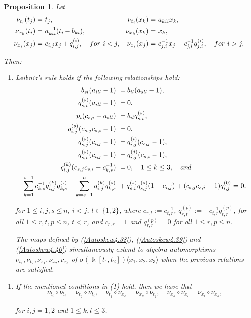 \documentclass{amsart}
\newtheorem{proposition}[theorem]{Proposition}
\theoremstyle{definition}
\theoremstyle{remark}
\numberwithin{equation}{section}
\begin{document}
\begin{proposition}\label{autoSkewPBW23}
Let
\begin{align}
   \nu_{t_i}(t_j) = &\ t_j, & \nu_{t_i}(x_k) = &\ a_{kii}x_k, \label{Autoskew4.38} \\
   \nu_{x_k}(t_i) = &\ a_{kii}^{-1}(t_i-b_{ki}),   &  \nu_{x_k}(x_k) = &\ x_k, \label{Autoskew4.39} \\
   \nu_{x_i}(x_j) = &\ c_{i,j}x_j+q_{i,j}^{(i)}, \quad {\rm for}\ i < j, & \nu_{x_i}(x_j) = &\ c_{j,i}^{-1}x_j-c_{j,i}^{-1}q_{j,i}^{(i)},  \quad {\rm for}\ i > j,  \label{Autoskew4.40}   
\end{align}

Then:
\begin{enumerate}
\item [\rm (1)] Leibniz's rule holds if the following relationships hold:
\begin{align}
    b_{sl}(a_{ill}-1) &\ =b_{il}(a_{sll}-1), \label{cond4.563} \\
    q_{s,i}^{(s)}(a_{ill}-1) &\ =0,\label{cond4.573} \\
    p_i(c_{s,i}-a_{sll}) &\ =b_{il}q_{s,i}^{(s)}, \label{cond4.583} \\
    q_{i,j}^{(s)}(c_{s,j}c_{s,i}-1) &\ =0, \label{cond4.593} \\
    q_{s,j}^{(s)}(c_{i,j}-1) &\ = q_{i,j}^{(i)}(c_{s,j}-1), \label{cond4.603} \\
    q_{s,i}^{(s)}(c_{i,j}-1) &\ = q_{i,j}^{(j)}(c_{s,i}-1), \label{cond4.613} \\
    q_{i,j}^{(k)}(c_{s,j}c_{s,i}-c_{k,s}^{-1}) &\ =0, \quad 1\leq k \leq 3, \quad {\rm and}  \label{cond4.623} \\
     \sum_{k=1}^{s-1}c_{k,s}^{-1}q_{i,j}^{(k)}q_{k,s}^{(s)}-\sum_{k=s+1}^{n}q_{i,j}^{(k)}q_{k,s}^{(s)} &\ 
     +q_{s,i}^{(s)}q_{s,j}^{(s)}(1-c_{i,j})+(c_{s,j}c_{s,i}-1)q_{i,j}^{(0)}  = 0. \label{cond4.633}
\end{align}

for $1 \leq i,j,s \leq n$, $i<j$, $l \in \{1, 2\}$, where $c_{r,t}:=c_{t,r}^{-1}$, $q_{r,t}^{(p)}:=-c_{t,r}^{-1}q_{t,r}^{(p)}$, for all $1 \leq r,t,p \leq n$, $t<r$, and  $c_{r,r}=1$ and $q_{r,r}^{(p)}=0$ for all $1 \leq r,p \leq n$.

The maps defined by {\rm (}\ref{Autoskew4.38}{\rm )}, {\rm (}\ref{Autoskew4.39}{\rm )} and {\rm (}\ref{Autoskew4.40}{\rm )} simultaneously extend to algebra automorphisms $\nu_{t_1}, \nu_{t_2}, \nu _{x_1}, \nu_{x_2}, \nu_{x_3}$ of $\sigma(\Bbbk[t_1, t_2])\langle x_1, x_2, x_3\rangle$ when the previous relations are satisfied.
\end{enumerate}
\begin{enumerate}
\item [\rm (2)] If the mentioned conditions in (1) hold, then we have that 
\begin{equation}\label{Eq1skew23}
   \nu_{t_i} \circ \nu_{t_j} = \nu_{t_j} \circ \nu_{t_i}, \quad \nu_{t_j} \circ \nu_{x_k} = \nu_{x_k} \circ \nu_{t_j}, \quad \nu_{x_k} \circ \nu_{x_l} = \nu_{x_l} \circ \nu_{x_k}, 
\end{equation}

for $i, j = 1, 2$ and $1\le k, l \leq 3$.
\end{enumerate}
\end{proposition}
\end{document}
